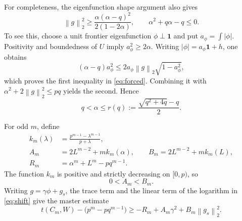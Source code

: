 \documentclass[11pt]{article}
\newcommand{\one}{\mathbf 1}
\newcommand{\norm}[1]{\left\lVert #1\right\rVert}
\begin{document}
For completeness, the eigenfunction shape argument also gives
\begin{equation}\label{eq:forced}
 \norm g_2^2\ge
 \frac{\alpha(\alpha-q)^2}{2(1-2\alpha)},
 \qquad
 \alpha^2+q\alpha-q\le0.
\end{equation}
To see this, choose a unit frontier eigenfunction $\phi\perp\one$ and put
$a_\phi=\int|\phi|$.  Positivity and boundedness of $U$ imply
$a_\phi^2\ge2\alpha$.  Writing
$|\phi|=a_\phi\one+h$, one obtains
\[
 (\alpha-q)a_\phi^2
 \le2a_\phi\norm g_2\sqrt{1-a_\phi^2},
\]
which proves the first inequality in \eqref{eq:forced}.  Combining it with
$\alpha^2+2\norm g_2^2\le pq$ yields the second.  Hence
\begin{equation}\label{eq:ceiling}
        q<\alpha\le r(q):=\frac{\sqrt{q^2+4q}-q}{2}.
\end{equation}

For odd $m$, define
\begin{align}
 k_m(\lambda)&=\frac{p^{m-1}-\lambda^{m-1}}{p+\lambda},\label{eq:kdef}\\
 A_m&=2L^{m-2}+m k_m(\alpha),\qquad
 B_m=2L^{m-2}+m k_m(L),\label{eq:AB}\\
 R_m&=\alpha^m+L^m-pq^{m-1}.\label{eq:R}
\end{align}
The function $k_m$ is positive and strictly decreasing on $[0,p)$, so
\begin{equation}\label{eq:A<B}
        0<A_m<B_m.
\end{equation}
Writing $g=\gamma\phi+g_s$, the trace term and the linear term of the logarithm
in \eqref{eq:shift} give the master estimate
\begin{equation}\label{eq:master}
 t(C_m,W)-\bigl(p^m-pq^{m-1}\bigr)
 \ge -R_m+A_m\gamma^2+B_m\norm{g_s}_2^2.
\end{equation}
\end{document}
